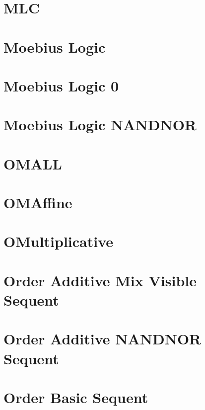 \documentclass{report}
\begin{document}
\chapter{MLC}


\chapter{Moebius Logic}
%

\chapter{Moebius Logic 0}
%

\chapter{Moebius Logic NANDNOR}
%

\chapter{OMALL}
%

\chapter{OMAffine}
%

\chapter{OMultiplicative}
%

\chapter{Order Additive Mix Visible Sequent}
%

\chapter{Order Additive NANDNOR Sequent}
%

\chapter{Order Basic Sequent}
%
\end{document}
